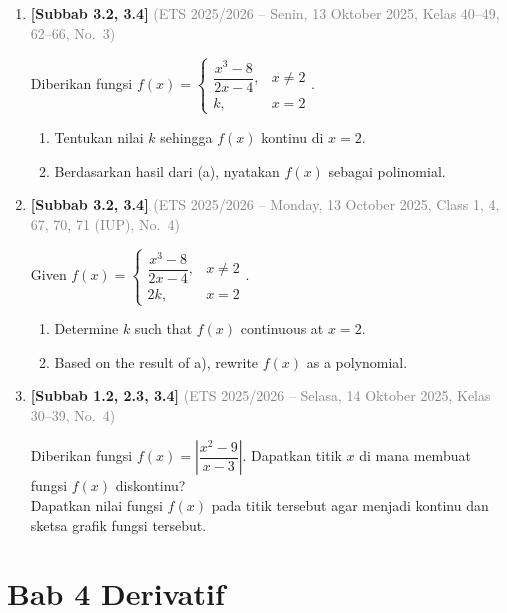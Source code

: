 \documentclass[10pt,openany,a4paper]{article}
\theoremstyle{definition}
\theoremstyle{definition}
\theoremstyle{plain}
\begin{document}
\begin{enumerate}
    \item \textbf{[Subbab 3.2, 3.4]} {\footnotesize\textcolor{gray}{(ETS 2025/2026 -- Senin, 13 Oktober 2025, Kelas 40--49, 62--66, No.~3)}}\par
    Diberikan fungsi $f(x) = \begin{cases} \dfrac{x^3-8}{2x-4}, & x \neq 2 \\ k, & x=2 \end{cases}$.
    \begin{enumerate}
        \item Tentukan nilai $k$ sehingga $f(x)$ kontinu di $x = 2$.
        \item Berdasarkan hasil dari (a), nyatakan $f(x)$ sebagai polinomial.
    \end{enumerate}

    \item \textbf{[Subbab 3.2, 3.4]} {\footnotesize\textcolor{gray}{(ETS 2025/2026 -- Monday, 13 October 2025, Class 1, 4, 67, 70, 71 (IUP), No.~4)}}\par
    Given $f(x) = \begin{cases} \dfrac{x^3-8}{2x-4}, & x \neq 2 \\ 2k, & x=2 \end{cases}$.
    \begin{enumerate}
        \item[a.] Determine $k$ such that $f(x)$ continuous at $x = 2$.
        \item[b.] Based on the result of a), rewrite $f(x)$ as a polynomial.
    \end{enumerate}

    \item \textbf{[Subbab 1.2, 2.3, 3.4]} {\footnotesize\textcolor{gray}{(ETS 2025/2026 -- Selasa, 14 Oktober 2025, Kelas 30--39, No.~4)}}\par
    Diberikan fungsi $f(x)=\left|\dfrac{x^2-9}{x-3}\right|$. Dapatkan titik $x$ di mana membuat fungsi $f(x)$ diskontinu?\\
    Dapatkan nilai fungsi $f(x)$ pada titik tersebut agar menjadi kontinu dan sketsa grafik fungsi tersebut.

\end{enumerate}
\newpage

\section*{Bab 4 \quad Derivatif}
\end{document}
